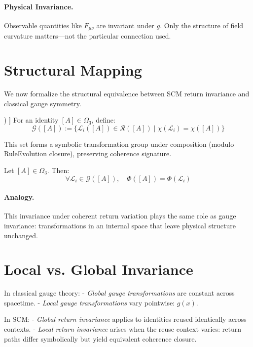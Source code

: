 \paragraph{Physical Invariance.}
Observable quantities like \( F_{\mu\nu} \) are invariant under \( g \). Only the structure of field curvature matters—not the particular connection used.

\section{Structural Mapping}

We now formalize the structural equivalence between SCM return invariance and classical gauge symmetry.

\begin{definition}[Return Group \( \mathcal{G}([A]) \)]
For an identity \( [A] \in \Omega_3 \), define:
\[
\mathcal{G}([A]) := \{ \mathcal{L}_i([A]) \in \mathcal{R}([A]) \mid \chi(\mathcal{L}_i) = \chi([A]) \}
\]
\end{definition}

This set forms a symbolic transformation group under composition (modulo RuleEvolution closure), preserving coherence signature.

\begin{proposition}
Let \( [A] \in \Omega_3 \). Then:
\[
\forall \mathcal{L}_i \in \mathcal{G}([A]), \quad \Phi([A]) = \Phi(\mathcal{L}_i)
\]
\end{proposition}

\paragraph{Analogy.}
This invariance under coherent return variation plays the same role as gauge invariance: transformations in an internal space that leave physical structure unchanged.

\section{Local vs. Global Invariance}

In classical gauge theory:
- \emph{Global gauge transformations} are constant across spacetime.
- \emph{Local gauge transformations} vary pointwise: \( g(x) \).

In SCM:
- \emph{Global return invariance} applies to identities reused identically across contexts.
- \emph{Local return invariance} arises when the reuse context varies: return paths differ symbolically but yield equivalent coherence closure.

